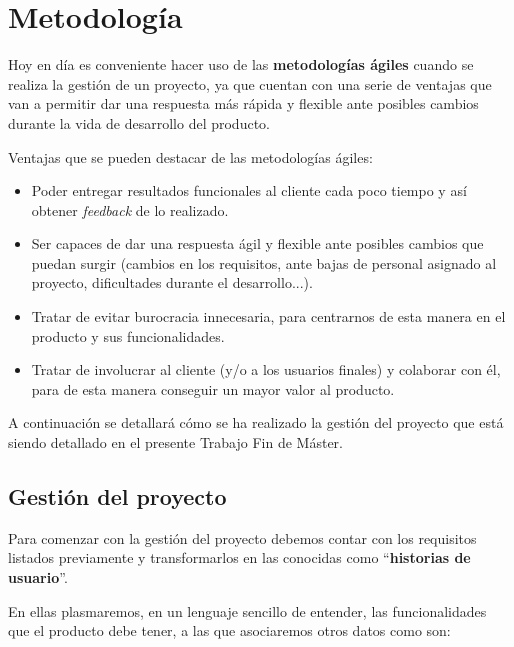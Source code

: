 \documentclass{\ClassPath/viu-tfm-template}
\begin{document}
\hypertarget{metodologia}{}
\chapter{Metodología}

Hoy en día es conveniente hacer uso de las \textbf{metodologías ágiles} cuando se realiza la gestión de un proyecto, ya que cuentan con una serie de ventajas que van a permitir dar una respuesta más rápida y flexible ante posibles cambios durante la vida de desarrollo del producto.

Ventajas que se pueden destacar de las metodologías ágiles:
\vspace{-10pt}
\begin{itemize}
    \item Poder entregar resultados funcionales al cliente cada poco tiempo y así obtener \textit{feedback} de lo realizado.
    \item Ser capaces de dar una respuesta ágil y flexible ante posibles cambios que puedan surgir (cambios en los requisitos, ante bajas de personal asignado al proyecto, dificultades durante el desarrollo...).
    \item Tratar de evitar burocracia innecesaria, para centrarnos de esta manera en el producto y sus funcionalidades.
    \item Tratar de involucrar al cliente (y/o a los usuarios finales) y colaborar con él, para de esta manera conseguir un mayor valor al producto.
\end{itemize}

A continuación se detallará cómo se ha realizado la gestión del proyecto que está siendo detallado en el presente Trabajo Fin de Máster.

\section{Gestión del proyecto}

Para comenzar con la gestión del proyecto debemos contar con los requisitos listados previamente y transformarlos en las conocidas como “\textbf{historias de usuario}”.

En ellas plasmaremos, en un lenguaje sencillo de entender, las funcionalidades que el producto debe tener, a las que asociaremos otros datos como son:
\end{document}
